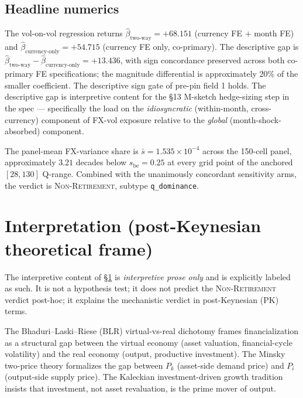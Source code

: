 \documentclass[11pt,letterpaper]{article}
\newcommand{\sbe}{s_{\mathrm{be}}}
\theoremstyle{assumption}
\begin{document}
\subsection{Headline numerics}
\label{sec:e10-headline}

The vol-on-vol regression returns
$\hat\beta_{\mathrm{two\text{-}way}} = +68.151$ (currency FE $+$ month FE)
and $\hat\beta_{\mathrm{currency\text{-}only}} = +54.715$ (currency FE only,
co-primary). The descriptive gap is
$\hat\beta_{\mathrm{two\text{-}way}} - \hat\beta_{\mathrm{currency\text{-}only}}
= +13.436$, with sign concordance preserved across both co-primary FE
specifications; the magnitude differential is approximately 20\% of the
smaller coefficient. The descriptive sign gate of pre-pin field 1 holds.
The descriptive gap is interpretive content for the \S13 M-sketch
hedge-sizing step in the spec --- specifically the load on the
\emph{idiosyncratic} (within-month, cross-currency) component of FX-vol
exposure relative to the \emph{global} (month-shock-absorbed) component.

The panel-mean FX-variance share is $\bar s = 1.535\times 10^{-4}$ across the
150-cell panel, approximately $3.21$ decades below $\sbe = 0.25$ at
every grid point of the anchored $[28, 130]$ Q-range. Combined with the
unanimously concordant sensitivity arms, the verdict is
\textsc{Non-Retirement}, subtype \texttt{q\_dominance}.

\section{Interpretation (post-Keynesian theoretical frame)}
\label{sec:e10-interpretation}

The interpretive content of \S\ref{sec:e10-interpretation} is
\emph{interpretive prose only} and is explicitly labeled as such. It is not
a hypothesis test; it does not predict the \textsc{Non-Retirement} verdict
post-hoc; it explains the mechanistic verdict in post-Keynesian (PK) terms.

The Bhaduri--Laski--Riese (BLR) virtual-vs-real dichotomy
\citep{BhaduriLaskiRiese2006} frames financialization as a structural gap
between the virtual economy (asset valuation, financial-cycle volatility)
and the real economy (output, productive investment). The Minsky two-price
theory \citep{Tymoigne2010,Minsky1975} formalizes the gap between
$P_k$ (asset-side demand price) and $P_i$ (output-side supply price). The
Kaleckian investment-driven growth tradition
\citep{Kalecki1971,BhaduriMarglin1990} insists that investment, not asset
revaluation, is the prime mover of output.
\end{document}
